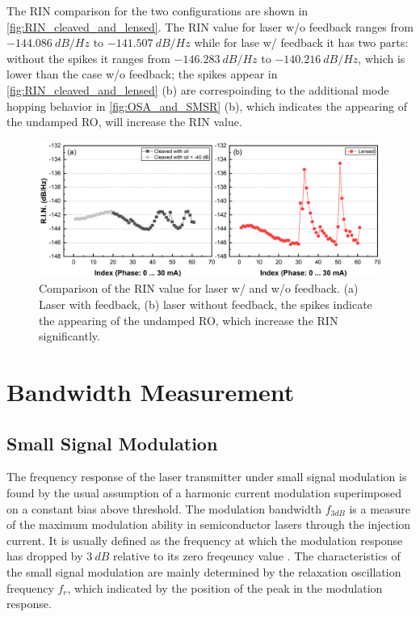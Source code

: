The RIN comparison for the two configurations are shown in \autoref{fig:RIN_cleaved_and_lensed}. The RIN value for laser w/o feedback ranges from $-144.086 \ dB/Hz$ to $-141.507 \ dB/Hz$ while for lase w/ feedback it has two parts: without the spikes it ranges from $-146.283 \ dB/Hz$ to $-140.216 \ dB/Hz$, which is lower than the case w/o feedback; the spikes appear in \autoref{fig:RIN_cleaved_and_lensed} (b) are correspoinding to the additional mode hopping behavior in \autoref{fig:OSA_and_SMSR} (b), which indicates the appearing of the undamped RO, will increase the RIN value.

\begin{figure}[ht]
    \centering
    \includegraphics[width=\linewidth]{figures/RIN_cleaved_and_lensed.png}
    \caption{Comparison of the RIN value for laser w/ and w/o feedback. (a) Laser with feedback, (b) laser without feedback, the spikes indicate the appearing of the undamped RO, which increase the RIN significantly.}
    \label{fig:RIN_cleaved_and_lensed}
\end{figure}

\section{Bandwidth Measurement}\label{sec:bandwidth_measurement}
\subsection{Small Signal Modulation}
The frequency response of the laser transmitter under small signal modulation is found by the usual assumption of a harmonic current modulation superimposed on a constant bias above threshold. The modulation bandwidth $f_{3dB}$ is a measure of the maximum modulation ability in semiconductor lasers through the injection current. It is usually defined as the frequency at which the modulation response has dropped by $3 \ dB$ relative to its zero freqeuncy value \cite{ohtsubo2012semiconductor, agrawal2013semiconductor}. The characteristics of the small signal modulation are mainly determined by the relaxation oscillation frequency $f_r$, which indicated by the position of the peak in the modulation response.

